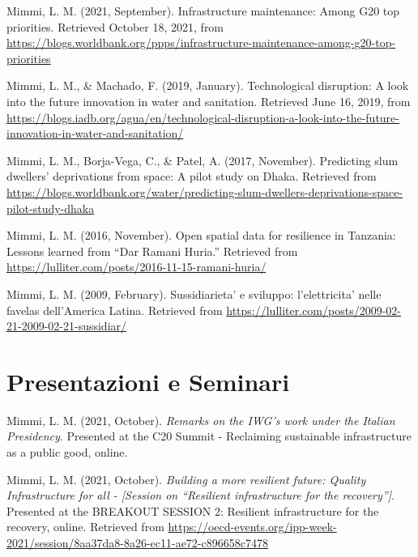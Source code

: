 \documentclass[11pt,a4paper,]{awesome-cv}
\begin{document}
\hypertarget{bibliography}{}
\leavevmode{}%
Mimmi, L. M. (2021, September). Infrastructure maintenance: Among G20
top priorities. Retrieved October 18, 2021, from
\url{https://blogs.worldbank.org/ppps/infrastructure-maintenance-among-g20-top-priorities}

\leavevmode{}%
Mimmi, L. M., \& Machado, F. (2019, January). Technological disruption:
A look into the future innovation in water and sanitation. Retrieved
June 16, 2019, from
\url{https://blogs.iadb.org/agua/en/technological-disruption-a-look-into-the-future-innovation-in-water-and-sanitation/}

\leavevmode{}%
Mimmi, L. M., Borja-Vega, C., \& Patel, A. (2017, November). Predicting
slum dwellers' deprivations from space: A pilot study on Dhaka.
Retrieved from
\url{https://blogs.worldbank.org/water/predicting-slum-dwellers-deprivations-space-pilot-study-dhaka}

\leavevmode{}%
Mimmi, L. M. (2016, November). Open spatial data for resilience in
Tanzania: Lessons learned from {``Dar Ramani Huria.''} Retrieved from
\url{https://lulliter.com/posts/2016-11-15-ramani-huria/}

\leavevmode{}%
Mimmi, L. M. (2009, February). Sussidiarieta' e sviluppo: l'elettricita'
nelle favelas dell'America Latina. Retrieved from
\url{https://lulliter.com/posts/2009-02-21-2009-02-21-sussidiar/}

\hypertarget{presentazioni-e-seminari}{%
\section{\texorpdfstring{ Presentazioni e
Seminari}{ Presentazioni e Seminari}}\label{presentazioni-e-seminari}}

\hypertarget{bibliography}{}
\leavevmode{}%
Mimmi, L. M. (2021, October). \emph{Remarks on the IWG's work under the
Italian Presidency}. Presented at the C20 Summit - Reclaiming
sustainable infrastructure as a public good, online.

\leavevmode{}%
Mimmi, L. M. (2021, October). \emph{Building a more resilient future:
Quality Infrastructure for all - {[}Session on {``Resilient
infrastructure for the recovery''}{]}}. Presented at the BREAKOUT
SESSION 2: Resilient infrastructure for the recovery, online. Retrieved
from
\url{https://oecd-events.org/ipp-week-2021/session/8aa37da8-8a26-ec11-ae72-c896658c7478}
\end{document}
